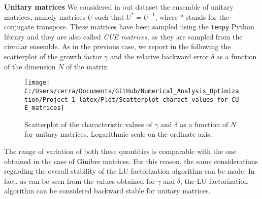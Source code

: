 \documentclass[a4paper,11pt]{article}
\begin{document}
\noindent \textbf{Unitary matrices } We considered in out dataset the ensemble of unitary matrices, namely matrices $U$ such that $U^{*} = U^{-1}$, where $*$ stands for the conjugate transpose. These matrices have been sampled using the \texttt{tenpy} Python library and they are also called \textit{CUE matrices}, as they are sampled from the circular ensemble. As in the previous case, we report in the following the scatterplot of the growth factor $\gamma$ and the relative backward error $\delta$ as a function of the dimension $N$ of the matrix.
\begin{figure}[H]
	\centering
	\texttt{[image: C:/Users/cerra/Documents/GitHub/Numerical\_Analysis\_Optimization/Project\_1\_latex/Plot/Scatterplot\_charact\_values\_for\_CUE\_matrices]}
	\caption{Scatterplot of the characteristic values of $\gamma$ and $\delta$ as a function of $N$ for unitary matrices. Logarithmic scale on the ordinate axis.}
	\label{fig:Scatterplot_CUE}
\end{figure}
\noindent  The range of variation of both these quantities is comparable with the one obtained in the case of Ginibre matrices. For this reason, the same considerations regarding the overall stability of the LU factorization algorithm can be made. In fact, as can be seen from the values obtained for $\gamma$ and $\delta$, the LU factorization algorithm can be considered backward stable for unitary matrices.\\
%
\end{document}
